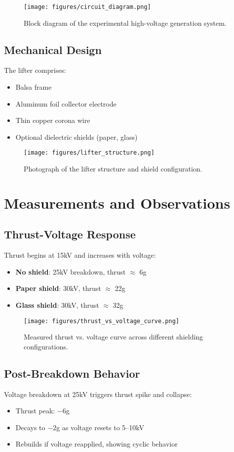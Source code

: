 \begin{figure}[h!]
    \centering
    \texttt{[image: figures/circuit\_diagram.png]}
    \caption{Block diagram of the experimental high-voltage generation system.}
\end{figure}

\subsection{Mechanical Design}
The lifter comprises:
\begin{itemize}
    \item Balsa frame
    \item Aluminum foil collector electrode
    \item Thin copper corona wire
    \item Optional dielectric shields (paper, glass)
\end{itemize}

\begin{figure}[h!]
    \centering
    \texttt{[image: figures/lifter\_structure.png]}
    \caption{Photograph of the lifter structure and shield configuration.}
\end{figure}

\section{Measurements and Observations}
\subsection{Thrust-Voltage Response}
Thrust begins at 15kV and increases with voltage:
\begin{itemize}
    \item \textbf{No shield}: 25kV breakdown, thrust $\approx$ 6g
    \item \textbf{Paper shield}: 30kV, thrust $\approx$ 22g
    \item \textbf{Glass shield}: 30kV, thrust $\approx$ 32g
\end{itemize}

\begin{figure}[h!]
    \centering
    \texttt{[image: figures/thrust\_vs\_voltage\_curve.png]}
    \caption{Measured thrust vs. voltage curve across different shielding configurations.}
\end{figure}

\subsection{Post-Breakdown Behavior}
Voltage breakdown at 25kV triggers thrust spike and collapse:
\begin{itemize}
    \item Thrust peak: $-6$g
    \item Decays to $-2$g as voltage resets to 5--10kV
    \item Rebuilds if voltage reapplied, showing cyclic behavior
\end{itemize}

